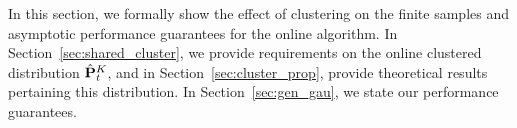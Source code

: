 


In this section, we formally show the effect of clustering on the finite samples and asymptotic performance guarantees for the online algorithm. 
% 
In Section~\ref{sec:shared_cluster}, we provide requirements on the online clustered distribution $\hat{{\mathbf P}}^K_t$, and in Section~\ref{sec:cluster_prop}, provide theoretical results pertaining this distribution. 
In Section~\ref{sec:gen_gau}, we  state our performance guarantees. 



